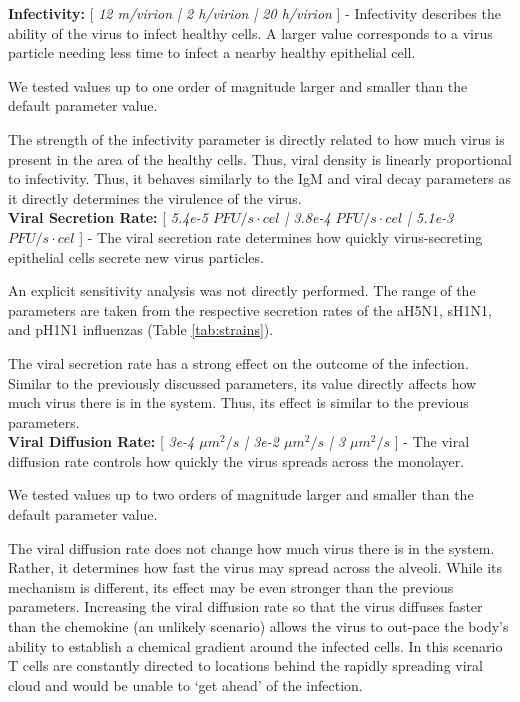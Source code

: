 \documentclass[preprint,10pt,authoryear]{article}
\begin{document}
\textbf{Infectivity:} [ \textit{12 m/virion | 2 h/virion | 20 h/virion} ] - Infectivity describes the ability of the virus to infect healthy cells.  A larger value corresponds to a virus particle needing less time to infect a nearby healthy epithelial cell.

We tested values up to one order of magnitude larger and smaller than the default parameter value.

The strength of the infectivity parameter is directly related to how much virus is present in the area of the healthy cells.  Thus, viral density is linearly proportional to infectivity.  Thus, it behaves similarly to the IgM and viral decay parameters as it directly determines the virulence of the virus. \\


\textbf{Viral Secretion Rate:} [ \textit{5.4e-5 $PFU/s\cdot cel$ | 3.8e-4 $PFU/s\cdot cel$ | 5.1e-3 $PFU/s\cdot cel$} ] - The viral secretion rate determines how quickly virus-secreting epithelial cells secrete new virus particles.

An explicit sensitivity analysis was not directly performed.  The range of the parameters are taken from the respective secretion rates of the aH5N1, sH1N1, and pH1N1 influenzas (Table \ref{tab:strains}).

The viral secretion rate has a strong effect on the outcome of the infection.  Similar to the previously discussed parameters, its value directly affects how much virus there is in the system.  Thus, its effect is similar to the previous parameters. \\


\textbf{Viral Diffusion Rate:} [ \textit{3e-4 $\mu m^2/s$ | 3e-2 $\mu m^2/s$ | 3 $\mu m^2/s$} ] - The viral diffusion rate controls how quickly the virus spreads across the monolayer.

We tested values up to two orders of magnitude larger and smaller than the default parameter value.

The viral diffusion rate does not change how much virus there is in the system.  Rather, it determines how fast the virus may spread across the alveoli.  While its mechanism is different, its effect may be even stronger than the previous parameters.  Increasing the viral diffusion rate so that the virus diffuses faster than the chemokine (an unlikely scenario) allows the virus to out-pace the body's ability to establish a chemical gradient around the infected cells.  In this scenario T cells are constantly directed to locations behind the rapidly spreading viral cloud and would be unable to `get ahead' of the infection. \\
\end{document}
